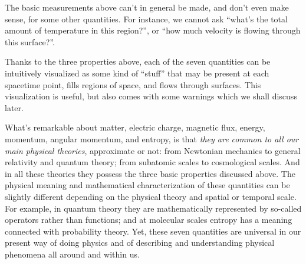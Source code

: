 \documentclass[a4paper,12pt,%
onecolumn,oneside,titlepage,%
british%
]{memoir}
\renewcommand*{\|}[1][]{\nonscript\:#1\vert\nonscript\:\mathopen{}}
\begin{document}
\smallskip

The basic measurements above can't in general be made, and don't even make sense, for some other quantities. For instance, we cannot ask \enquote{what's the total amount of temperature in this region?}, or \enquote{how much velocity is flowing through this surface?}.

\smallskip

Thanks to the three properties above, each of the seven quantities can be intuitively visualized as some kind of \enquote{stuff} that may be present at each spacetime point, fills regions of space, and flows through surfaces. This visualization is useful, but also comes with some warnings which we shall discuss later.


\medskip

What's remarkable about matter, electric charge, magnetic flux, energy, momentum, angular momentum, and entropy, is that \emph{they are common to all our main physical theories}, approximate or not: from Newtonian mechanics to general relativity and quantum theory; from subatomic scales to cosmological scales. And in all these theories they possess the three basic properties discussed above. The physical meaning and mathematical characterization of these quantities can be slightly different depending on the physical theory and spatial or temporal scale. For example, in quantum theory they are mathematically represented by so-called operators rather than functions; and at molecular scales entropy has a meaning connected with probability theory. Yet, these seven quantities are universal in our present way of doing physics and of describing and understanding physical phenomena all around and within us.
\end{document}
